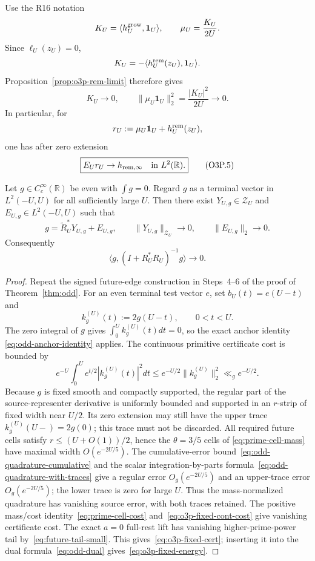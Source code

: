 Use the R16 notation
\[
 K_U=\langle h_U^{\rm grow},\mathbf1_U\rangle,
 \qquad
 \mu_U=\frac{K_U}{2U}.
\]
Since $\ell_U(z_U)=0$,
\[
 K_U=-\langle h_U^{\rm rem}(z_U),\mathbf1_U\rangle.
\]
Proposition~\ref{prop:o3p-rem-limit} therefore gives
\[
 \boxed{K_U\to0,
 \qquad
 \|\mu_U\mathbf1_U\|_2^2=\frac{|K_U|^2}{2U}\to0.}
\tag{O3P.4}\label{eq:o3p-mu-vanish}
\]
In particular, for
\[
 r_U:=\mu_U\mathbf1_U+h_U^{\rm rem}(z_U),
\]
one has after zero extension
\[
 \boxed{E_Ur_U\to h_{\rm rem,\infty}\quad\text{in }L^2(\mathbb R).}
\tag{O3P.5}\label{eq:o3p-r-limit}
\]

\begin{lemma}
\label{lem:o3p-fixed-absorption}
Let $g\in C_c^\infty(\mathbb R)$ be even with $\int g=0$.  Regard $g$ as a terminal
vector in $L^2(-U,U)$ for all sufficiently large $U$.  Then there exist
$Y_{U,g}\in\mathscr Z_U$ and $E_{U,g}\in L^2(-U,U)$ such that
\[
 \boxed{
 g=\widetilde R_U^*Y_{U,g}+E_{U,g},
 \qquad
 \|Y_{U,g}\|_{\mathscr Z_U}\to0,
 \qquad
 \|E_{U,g}\|_2\to0.
 }
\tag{O3P.6}\label{eq:o3p-fixed-cert}
\]
Consequently
\[
 \boxed{
 \langle g,(I+R_U^*R_U)^{-1}g\rangle\to0.
 }
\tag{O3P.7}\label{eq:o3p-fixed-energy}
\]
\end{lemma}

\begin{proof}
Repeat the signed future-edge construction in Steps~4--6 of the proof of
Theorem~\ref{thm:odd}.  For an even terminal test vector $e$, set
$b_U(t)=e(U-t)$ and
\[
 k_g^{(U)}(t):=2g(U-t),\qquad 0<t<U.
\]
The zero integral of $g$ gives $\int_0^Uk_g^{(U)}(t)dt=0$, so the exact anchor identity
\eqref{eq:odd-anchor-identity} applies.  The continuous primitive certificate cost is
bounded by
\[
 e^{-U}\int_0^Ue^{t/2}|k_g^{(U)}(t)|^2dt
 \le e^{-U/2}\|k_g^{(U)}\|_2^2
 \ll_g e^{-U/2}.
\tag{O3P.8}\label{eq:o3p-fixed-cont-cost}
\]
Because $g$ is fixed smooth and compactly supported, the regular part of the
source-representer derivative is uniformly bounded and supported in an $r$-strip
of fixed width near $U/2$.  Its zero extension may still have the upper trace
$k_g^{(U)}(U-)=2g(0)$; this trace must not be discarded.
All required future cells satisfy
$r\le(U+O(1))/2$, hence the $\theta=3/5$ cells of
\eqref{eq:prime-cell-mass} have maximal width $O(e^{-2U/5})$.
The cumulative-error bound~\eqref{eq:odd-quadrature-cumulative} and the
scalar integration-by-parts formula~\eqref{eq:odd-quadrature-with-traces}
give a regular error $O_g(e^{-2U/5})$ and an upper-trace error
$O_g(e^{-2U/5})$; the lower trace is zero for large $U$.
Thus the mass-normalized quadrature has vanishing source error, with both
traces retained.  The positive mass/cost identity~\eqref{eq:prime-cell-cost}
and~\eqref{eq:o3p-fixed-cont-cost} give vanishing certificate cost.
The exact $a=0$ full-rest lift has vanishing higher-prime-power tail
by~\eqref{eq:future-tail-small}.  This gives~\eqref{eq:o3p-fixed-cert}; inserting it into
the dual formula~\eqref{eq:odd-dual} gives~\eqref{eq:o3p-fixed-energy}.
\end{proof}

